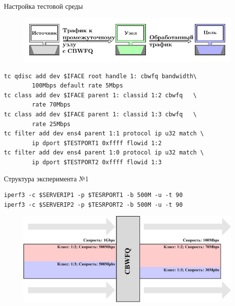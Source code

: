 \documentclass[12pt]{beamer}
\begin{document}
\begin{frame}[fragile]{Настройка тестовой среды}
	\begin{figure}[t]
		\center
    	\includegraphics[scale=0.8]{../text/pdfimages/test_scheme.pdf}
	\end{figure}
{\footnotesize
	\begin{lstlisting}[frame=single]
tc qdisc add dev $IFACE root handle 1: cbwfq bandwidth\
        100Mbps default rate 5Mbps
tc class add dev $IFACE parent 1: classid 1:2 cbwfq   \
        rate 70Mbps
tc class add dev $IFACE parent 1: classid 1:3 cbwfq   \
        rate 25Mbps
tc filter add dev ens4 parent 1:1 protocol ip u32 match \
        ip dport $TESTPORT1 0xffff flowid 1:2
tc filter add dev ens4 parent 1:0 protocol ip u32 match \
        ip dport $TESTPORT2 0xffff flowid 1:3
    \end{lstlisting}
}
%
\end{frame}

\begin{frame}[fragile]{Структура эксперимента №1}

{\footnotesize
	\begin{lstlisting}[frame=single,emph={iperf3},emphstyle={\bfseries}]
iperf3 -c $SERVERIP1 -p $TESRPORT1 -b 500M -u -t 90
iperf3 -c $SERVERIP2 -p $TESRPORT2 -b 500M -u -t 90
    \end{lstlisting}
}%
	\begin{figure}
		\center
    	\includegraphics[scale=0.65]{../text/pdfimages/exp_scheme.pdf}
	\end{figure}
\end{frame}
\end{document}
